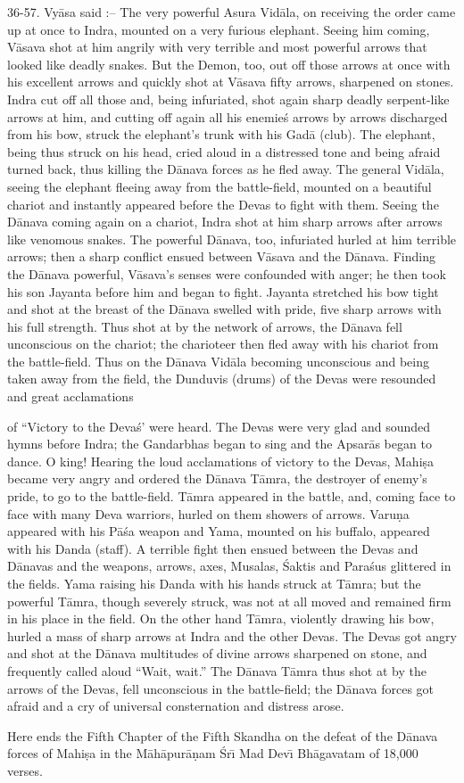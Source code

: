 36-57. Vy\=asa said :-- The very powerful Asura Vid\=ala, on receiving the order came up at once to Indra, mounted on a very furious elephant. Seeing him coming, V\=asava shot at him angrily with very terrible and most powerful arrows that looked like deadly snakes. But the Demon, too, out off those arrows at once with his excellent arrows and quickly shot at V\=asava fifty arrows, sharpened on stones. Indra cut off all those and, being infuriated, shot again sharp deadly serpent-like arrows at him, and cutting off again all his enemie\'s arrows by arrows discharged from his bow, struck the elephant's trunk with his Gad\=a (club). The elephant, being thus struck on his head, cried aloud in a distressed tone and being afraid turned back, thus killing the D\=anava forces as he fled away. The general Vid\=ala, seeing the elephant fleeing away from the battle-field, mounted on a beautiful chariot and instantly appeared before the Devas to fight with them. Seeing the D\=anava coming again on a chariot, Indra shot at him sharp arrows after arrows like venomous snakes. The powerful D\=anava, too, infuriated hurled at him terrible arrows; then a sharp conflict ensued between V\=asava and the D\=anava. Finding the D\=anava powerful, V\=asava's senses were confounded with anger; he then took his son Jayanta before him and began to fight. Jayanta stretched his bow tight and shot at the breast of the D\=anava swelled with pride, five sharp arrows with his full strength. Thus shot at by the network of arrows, the D\=anava fell unconscious on the chariot; the charioteer then fled away with his chariot from the battle-field. Thus on the D\=anava Vid\=ala becoming unconscious and being taken away from the field, the Dunduvis (drums) of the Devas were resounded and great acclamations

of ``Victory to the Deva\'s' were heard. The Devas were very glad and sounded hymns before Indra; the Gandarbhas began to sing and the Apsar\=as began to dance. O king! Hearing the loud acclamations of victory to the Devas, Mahi\d{s}a became very angry and ordered the D\=anava T\=amra, the destroyer of enemy's pride, to go to the battle-field. T\=amra appeared in the battle, and, coming face to face with many Deva warriors, hurled on them showers of arrows. Varu\d{n}a appeared with his P\=a\'sa weapon and Yama, mounted on his buffalo, appeared with his Danda (staff). A terrible fight then ensued between the Devas and D\=anavas and the weapons, arrows, axes, Musalas, \'Saktis and Para\'sus glittered in the fields. Yama raising his Danda with his hands struck at T\=amra; but the powerful T\=amra, though severely struck, was not at all moved and remained firm in his place in the field. On the other hand T\=amra, violently drawing his bow, hurled a mass of sharp arrows at Indra and the other Devas. The Devas got angry and shot at the D\=anava multitudes of divine arrows sharpened on stone, and frequently called aloud ``Wait, wait.'' The D\=anava T\=amra thus shot at by the arrows of the Devas, fell unconscious in the battle-field; the D\=anava forces got afraid and a cry of universal consternation and distress arose.

Here ends the Fifth Chapter of the Fifth Skandha on the defeat of the D\=anava forces of Mahi\d{s}a in the M\=ah\=apur\=a\d{n}am \'Sr\={\i} Mad Dev\={\i} Bh\=agavatam of 18,000 verses.



